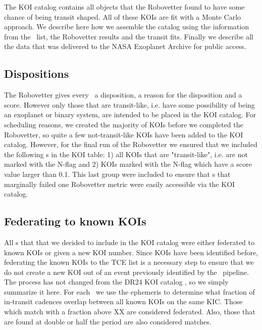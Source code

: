 The KOI catalog contains all objects that the Robovetter found to have some chance of being transit shaped. All of these KOIs are fit with a Monte Carlo approach. We describe here how we assemble the catalog using the information from the \opstce\ list, the Robovetter results and the transit fits. Finally we describe all the data that was delivered to the NASA Exoplanet Archive for public access.
\label{koisec}

\subsection{Dispositions}
The Robovetter gives every \opstce\ a disposition, a reason for the disposition and a score.  However only those that are transit-like, i.e. have some possibility of being an exoplanet or binary system, are intended to be placed in the KOI catalog. For scheduling reasons, we created the majority of KOIs before we completed the Robovetter, so quite a few not-transit-like KOIs have been added to the KOI catalog. However, for the final run of the Robovetter we ensured that we included the following \opstce s in the KOI table: 1) all KOIs that are "transit-like", i.e. are not marked with the N-flag and 2) KOIs marked with the N-flag which have a score value larger than 0.1.  This last group were included to ensure that \opstce s that marginally failed one Robovetter metric were easily accessible via the KOI catalog. 


\subsection{Federating to known KOIs}
All \opstce s that that we decided to include in the KOI catalog were either federated to known KOIs or given a new KOI number. Since KOIs have been identified before, federating the known KOIs to the TCE list is a necessary step to ensure that we do not create a new KOI out of an event previously identified by the \Kepler\ pipeline.  The process has not changed from the  DR24 KOI catalog \citep{Coughlin2016}, so we simply summarize it here.  For each \opstce\ we use the ephemeris to determine what fraction of in-transit cadences overlap between all known KOIs on the same KIC.  Those which match with a fraction above XX are considered federated.  Also, those that are found at double or half the period are also considered matches.  

